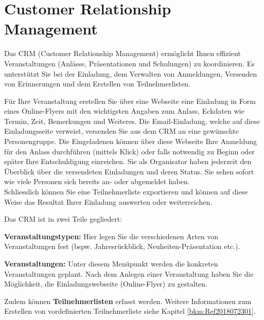 \clearpage
\section{Customer Relationship Management}

Das CRM (Customer Relationship Management) ermöglicht Ihnen effizient Veranstaltungen (Anlässe, Präsentationen und Schulungen) zu koordinieren. Es unterstützt Sie bei der Einladung, dem Verwalten von Anmeldungen, Versenden von Erinnerungen und dem Erstellen von Teilnehmerlisten.

\vspace{\baselineskip}

Für Ihre Veranstaltung erstellen Sie über eine Webseite eine Einladung in Form eines Online-Flyers mit den wichtigsten Angaben zum Anlass, Eckdaten wie Termin, Zeit, Bemerkungen und Weiteres. Die Email-Einladung, welche auf diese Einladungsseite verweist, versenden Sie aus dem CRM an eine gewünschte Personengruppe. Die Eingeladenen können über diese Webseite Ihre Anmeldung für den Anlass durchführen (mittels Klick) oder falls notwendig zu Beginn oder später Ihre Entschuldigung einreichen. Sie als Organisator haben jederzeit den Überblick über die versendeten Einladungen und deren Status. Sie sehen sofort wie viele Personen sich bereits an- oder abgemeldet haben. \\

Schliesslich können Sie eine Teilnehmerliste exportieren und können auf diese Weise das Resultat Ihrer Einladung auswerten oder weiterreichen.

\vspace{\baselineskip}

Das CRM ist in zwei Teile gegliedert: 
\begin{compactitem}
\item
\textbf{Veranstaltungstypen:} Hier legen Sie die verschiedenen Arten von Veranstaltungen fest (bspw. Jahresrückblick, Neuheiten-Präsentation etc.).
\item
\textbf{Veranstaltungen:} Unter diesem Menüpunkt werden die konkreten Veranstaltungen geplant. Nach dem Anlegen einer Veranstaltung haben Sie die Möglichkeit, die Einladungswebseite (Online-Flyer) zu gestalten.
\end{compactitem}

\vspace{\baselineskip}

Zudem können \textbf{Teilnehmerlisten} erfasst werden. Weitere Informationen zum Erstellen von vordefinierten Teilnehmerliste siehe Kapitel \ref{bkm:Ref2018072301}.

